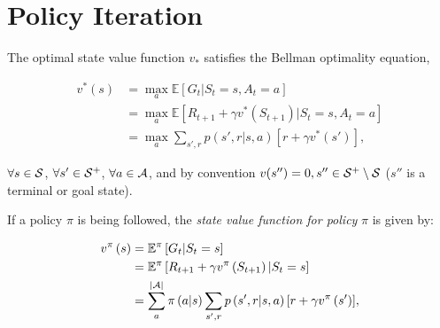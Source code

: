 \documentclass[a4paper]{article}
\begin{document}



\vfill
\newpage
\appendix

\section{Policy Iteration}
\label{app_sec:policy_iteration}

The optimal state value function $v_{*}$ satisfies the Bellman optimality equation, 

\begin{align}
v^{*}\left( s \right) &= \max_{a} \mathbb{E} \left[ G_t | S_t =s, A_t = a \right] \\
                              &= \max_{a} \mathbb{E} \left[ R_{t+1} + \gamma v^{*}\left( S_{t+1} \right) | S_t = s, A_t = a \right] \\
                              &= \max_{a} \sum\limits_{s',r} { p\left( {s',r|s,a} \right) \left[ r + \gamma v^{*}\left( s' \right) \right] },
\end{align}

$\forall s \in \cal{S}$, $\forall s' \in \cal{S^{+}}$, $\forall a \in \cal{A}$, and by convention $v(s'') = 0, s'' \in \cal{S^{+}} \setminus \cal{S}$ ($s''$ is a terminal or goal state).

If a policy $\pi$ is being followed, the \textit{state value function for policy} $\pi$ is given by:

\begin{align}
v^{\pi}\left( s \right) &= \mathbb{E}^{\pi} \left[ G_t | S_t =s \right] \\
                              &= \mathbb{E}^{\pi} \left[ R_{t+1} + \gamma v^{\pi}\left( S_{t+1} \right) | S_t = s \right] \\
                              &= \sum\limits_{a}^{|{\cal A}|} \pi \left( a|s\right) \sum\limits_{s',r} { p\left( {s',r|s,a} \right) \left[ r + \gamma v^{\pi}\left( s' \right) \right] },
\end{align}
\end{document}
